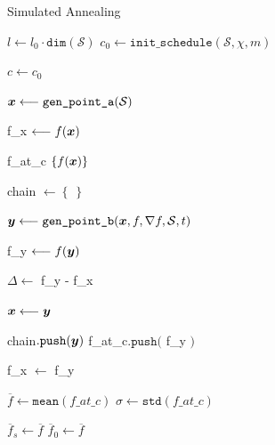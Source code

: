 \begin{algorithm}
\caption{Simulated Annealing}\label{algo:sa}
\vspace{8pt}
\nosemic
\SetAlgoLined
{}

$l \longleftarrow l_0 \cdot \texttt{dim}(\mathcal{S}) $ \;
$c_0 \longleftarrow \texttt{init\_schedule}(\mathcal{S}, \chi, m) $ \;

$c  \longleftarrow c_0$ \;

$\boldsymbol{x} \longleftarrow \texttt{gen\_point\_a}(\mathcal{S})$ \;

f\_x $\longleftarrow f(\boldsymbol{x})$ \;

{
    f\_at\_c \longleftarrow $\left\lbrace f(\boldsymbol{x}) \right\rbrace$ \;

    chain $\longleftarrow \left\lbrace \: \right\rbrace$ \;

     {

        $\boldsymbol{y} \longleftarrow \texttt{gen\_point\_b}(\boldsymbol{x}, f, \nabla f,\mathcal{S}, t )  $ \;

        f\_y $\longleftarrow f(\boldsymbol{y})$ \;

        $\Delta \longleftarrow $ f\_y - f\_x \;

        \If{ $\Delta \leq 0$ or $\exp\left( -\Delta /c ) > \texttt{random}[0,1) $ }
        {
            $\boldsymbol{x} \longleftarrow \boldsymbol{y} $ 

            chain$.\texttt{push}(\boldsymbol{y})$ \;
            f\_at\_c$.\texttt{push}($ f\_y $)$\;

            f\_x $\longleftarrow$ f\_y \;


        }


    }

    $\overline{f} \longleftarrow \texttt{mean}(f\_at\_c)$ \;
    $\sigma \longleftarrow \texttt{std}(f\_at\_c)$ \;


     {
        $\overline{f}_s \longleftarrow \overline{f}$ \;
        $\overline{f}_0 \longleftarrow \overline{f}$ \;

    } 

}
\end{algorithm}
